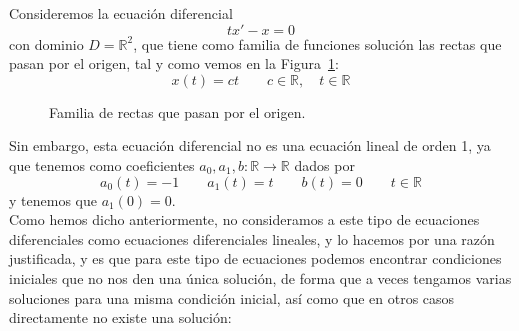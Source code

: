 \begin{ejemplo}
    Consideremos la ecuación diferencial
    \begin{equation*}
        tx'-x = 0
    \end{equation*}
    con dominio $D=\mathbb{R}^2$, que tiene como familia de funciones solución las rectas que pasan por el origen, tal y como vemos en la Figura~\ref{fig:familia_rectas_origen}:
    \begin{equation*}
        x(t) = ct \qquad c\in \mathbb{R}, \quad t\in \mathbb{R}
    \end{equation*}

\begin{figure}[H]
\centering    
{}
\caption{Familia de rectas que pasan por el origen.}
\label{fig:familia_rectas_origen}
\end{figure}
    Sin embargo, esta ecuación diferencial no es una ecuación lineal de orden 1, ya que tenemos como coeficientes $a_0,a_1,b:\mathbb{R}\rightarrow\mathbb{R}$ dados por
    \begin{equation*}
        a_0(t) = -1 \qquad a_1(t) = t \qquad b(t) = 0 \qquad t\in \mathbb{R}
    \end{equation*}
    y tenemos que $a_1(0) = 0$.\\

    Como hemos dicho anteriormente, no consideramos a este tipo de ecuaciones diferenciales como ecuaciones diferenciales lineales, y lo hacemos por una razón justificada, y es que para este tipo de ecuaciones podemos encontrar condiciones iniciales que no nos den una única solución, de forma que a veces tengamos varias soluciones para una misma condición inicial, así como que en otros casos directamente no existe una solución:


\end{ejemplo}
